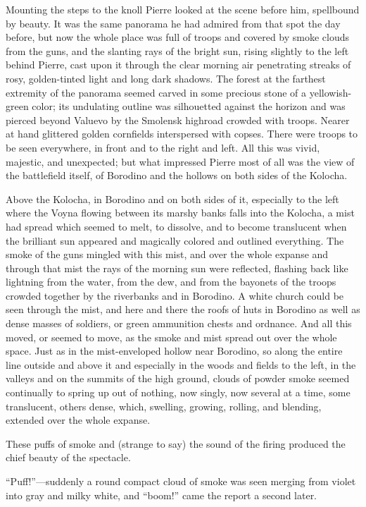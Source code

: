 Mounting the steps to the knoll Pierre looked at the scene before
him, spellbound by beauty. It was the same panorama he had
admired from that spot the day before, but now the whole place
was full of troops and covered by smoke clouds from the guns, and
the slanting rays of the bright sun, rising slightly to the left
behind Pierre, cast upon it through the clear morning air
penetrating streaks of rosy, golden-tinted light and long dark
shadows. The forest at the farthest extremity of the panorama
seemed carved in some precious stone of a yellowish-green color;
its undulating outline was silhouetted against the horizon and
was pierced beyond Valuevo by the Smolensk highroad crowded with
troops.  Nearer at hand glittered golden cornfields interspersed
with copses.  There were troops to be seen everywhere, in front
and to the right and left. All this was vivid, majestic, and
unexpected; but what impressed Pierre most of all was the view of
the battlefield itself, of Borodino and the hollows on both sides
of the Kolocha.

Above the Kolocha, in Borodino and on both sides of it,
especially to the left where the Voyna flowing between its marshy
banks falls into the Kolocha, a mist had spread which seemed to
melt, to dissolve, and to become translucent when the brilliant
sun appeared and magically colored and outlined everything. The
smoke of the guns mingled with this mist, and over the whole
expanse and through that mist the rays of the morning sun were
reflected, flashing back like lightning from the water, from the
dew, and from the bayonets of the troops crowded together by the
riverbanks and in Borodino. A white church could be seen through
the mist, and here and there the roofs of huts in Borodino as
well as dense masses of soldiers, or green ammunition chests and
ordnance. And all this moved, or seemed to move, as the smoke and
mist spread out over the whole space. Just as in the
mist-enveloped hollow near Borodino, so along the entire line
outside and above it and especially in the woods and fields to
the left, in the valleys and on the summits of the high ground,
clouds of powder smoke seemed continually to spring up out of
nothing, now singly, now several at a time, some translucent,
others dense, which, swelling, growing, rolling, and blending,
extended over the whole expanse.

These puffs of smoke and (strange to say) the sound of the firing
produced the chief beauty of the spectacle.

``Puff!''---suddenly a round compact cloud of smoke was seen
merging from violet into gray and milky white, and ``boom!'' came
the report a second later.

